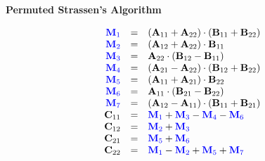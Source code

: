     \begin{center}
        \textbf{Permuted Strassen's Algorithm}
        \vspace{-20pt}
    \end{center}
    \begin{equation}
        \begin{array}{rcl}
            \color{blue} \mathbf{M}_1 & = & (\mathbf{A}_{11} + \mathbf{A}_{22})\cdot (\mathbf{B}_{11} + \mathbf{B}_{22}) \\
            \color{blue} \mathbf{M}_2 & = & (\mathbf{A}_{12} + \mathbf{A}_{22})\cdot \mathbf{B}_{11} \\
            \color{blue} \mathbf{M}_3 & = & \mathbf{A}_{22}\cdot (\mathbf{B}_{12} - \mathbf{B}_{11}) \\
            \color{blue} \mathbf{M}_4 & = & (\mathbf{A}_{21} - \mathbf{A}_{22})\cdot (\mathbf{B}_{12} + \mathbf{B}_{22}) \\
            \color{blue} \mathbf{M}_5 & = & (\mathbf{A}_{11} + \mathbf{A}_{21})\cdot \mathbf{B}_{22} \\
            \color{blue} \mathbf{M}_6 & = & \mathbf{A}_{11}\cdot (\mathbf{B}_{21} - \mathbf{B}_{22}) \\
            \color{blue} \mathbf{M}_7 & = & (\mathbf{A}_{12} - \mathbf{A}_{11})\cdot (\mathbf{B}_{11} + \mathbf{B}_{21}) \\
            \mathbf{C}_{11} & = & \color{blue} \mathbf{M}_1 \color{black} + \color{blue} \mathbf{M}_3 \color{black} - \color{blue} \mathbf{M}_4 \color{black} - \color{blue} \mathbf{M}_6 \\
            \mathbf{C}_{12} & = & \color{blue} \mathbf{M}_2 \color{black} + \color{blue} \mathbf{M}_3 \\
            \mathbf{C}_{21} & = & \color{blue} \mathbf{M}_5 \color{black} + \color{blue} \mathbf{M}_6 \\
            \mathbf{C}_{22} & = & \color{blue} \mathbf{M}_1 \color{black} - \color{blue} \mathbf{M}_2 \color{black} + \color{blue} \mathbf{M}_5 \color{black} + \color{blue} \mathbf{M}_7
        \end{array}
        \label{eq:per_strassen}
    \end{equation}
    
